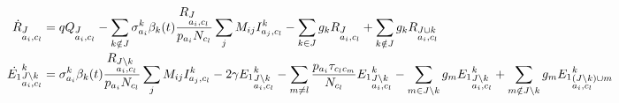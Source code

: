 \begin{footnotesize}
\begin{align}
\dot{R}_{\begin{subarray}{l}J\\ a_i, c_l \end{subarray}} &=  q Q_{\begin{subarray}{l}J  \\ a_i,
    c_l \end{subarray}} - \sum_{k \notin J} \sigma_{a_i}^k \beta_k(t)
\frac{R_{\begin{subarray}{l}J\\ a_i, c_l \end{subarray}}}{p_{a_i} N_{c_l}} \sum_j M_{ij}
I^k_{a_j,c_l} -\sum_{k
  \in J} g_k R_{\begin{subarray}{l}J\\ a_i, c_l \end{subarray}} + \sum_{k
  \notin J} g_k R_{\begin{subarray}{l}J \cup k \\ a_i, c_l \end{subarray}} \notag \\
\dot{E_1}^k_{\begin{subarray}{l}J \setminus k\\ a_i,
    c_l \end{subarray}} &=\sigma_{a_i}^k \beta_k(t)
\frac{R_{\begin{subarray}{l}J \setminus k\\ a_i, c_l \end{subarray}}}{p_{a_i} N_{c_l}} \sum_j M_{ij}
I^k_{a_j,c_l} -2 \gamma {E_1}^k_{\begin{subarray}{l}J
    \setminus k\\ a_i, c_l \end{subarray}} -\sum_{m\neq l}
\frac{p_{a_i} \tau_{c_lc_m}}{N_{c_l}} {E_1}^k_{\begin{subarray}{l}J \setminus k\\ a_i,
    c_l \end{subarray}} -\sum_{m
  \in J \setminus k} g_m {E_1}^k_{\begin{subarray}{l}J \setminus k\\ a_i, c_l \end{subarray}} + \sum_{m
  \notin J \setminus k} g_m {E_1}^k_{\begin{subarray}{l} (J \setminus k) \cup m \\ a_i, c_l \end{subarray}} 
\notag \\

\end{align}
\end{footnotesize}
